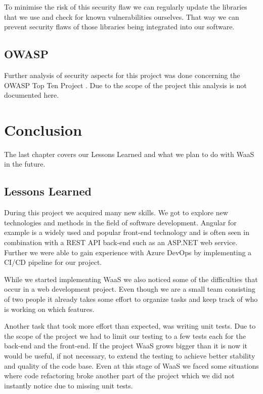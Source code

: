 \documentclass[titlepage, 12pt]{article}
\begin{document}
To minimise the risk of this security flaw we can regularly update the libraries that we use and check for known vulnerabilities ourselves. That way we can prevent security flaws of those libraries being integrated into our software.

\subsection{OWASP}

Further analysis of security aspects for this project was done concerning the OWASP Top Ten Project \cite{mOWASPTopTen}. Due to the scope of the project this analysis is not documented here.

\section{Conclusion}

The last chapter covers our Lessons Learned and what we plan to do with WaaS in the future.

\subsection{Lessons Learned}
\label{section:LessonsLearned}

During this project we acquired many new skills. We got to explore new technologies and methods in the field of software development. Angular for example is a widely used and popular front-end technology and is often seen in combination with a REST API back-end such as an ASP.NET web service.
Further we were able to gain experience with Azure DevOps by implementing a CI/CD pipeline for our project.


While we started implementing WaaS we also noticed some of the difficulties that occur in a web development project. Even though we are a small team consisting of two people it already takes some effort to organize tasks and keep track of who is working on which features.


Another task that took more effort than expected, was writing unit tests. Due to the scope of the project we had to limit our testing to a few tests each for the back-end and the front-end. If the project WaaS grows bigger than it is now it would be useful, if not necessary, to extend the testing to achieve better stability and quality of the code base. Even at this stage of WaaS we faced some situations where code refactoring broke another part of the project which we did not instantly notice due to missing unit tests.
\end{document}

